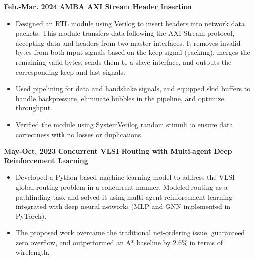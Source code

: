\documentclass[11pt,a4paper,sans]{moderncv}
\begin{document}
\cventry
{\textnormal{\textbf{Feb.-Mar. 2024}}}
{\textnormal{\textbf{AMBA AXI Stream Header Insertion}}}
{}{}{}
{
    \begin{itemize}
        \item Designed an RTL module using Verilog to insert headers into network data packets. This module transfers data following the AXI Stream protocol, accepting data and headers from two master interfaces. It removes invalid bytes from both input signals based on the keep signal (packing), merges the remaining valid bytes, sends them to a slave interface, and outputs the corresponding keep and last signals.
        \item Used pipelining for data and handshake signals, and equipped skid buffers to handle backpressure, eliminate bubbles in the pipeline, and optimize throughput.
        \item Verified the module using SystemVerilog random stimuli to ensure data correctness with no losses or duplications.
    \end{itemize}
}


\cventry
{\textnormal{\textbf{May-Oct. 2023}}}
{\textnormal{\textbf{Concurrent VLSI Routing with Multi-agent
Deep Reinforcement Learning}}}
{}{}{}
{
    \begin{itemize}
        \item Developed a Python-based machine learning model to address the VLSI global routing problem in a concurrent manner. Modeled routing as a pathfinding task and solved it using multi-agent reinforcement learning integrated with deep neural networks (MLP and GNN implemented in PyTorch).
        \item The proposed work overcame the traditional net-ordering issue, guaranteed zero overflow, and outperformed an A* baseline by 2.6\% in terms of wirelength.
        \end{itemize}
}

\end{document}
